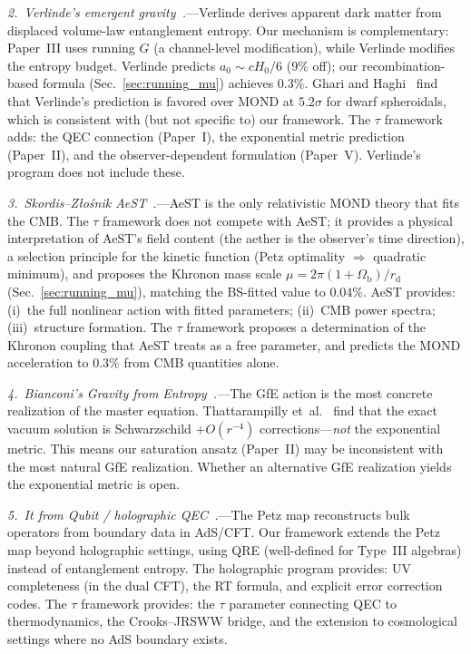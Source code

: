 \documentclass[prd,twocolumn,superscriptaddress,longbibliography,floatfix]{revtex4-2}
\newcommand{\tauasym}{\tau}
\begin{document}
\emph{2.\ Verlinde's emergent
gravity~\cite{Verlinde2016}.}---Verlinde derives
apparent dark matter from displaced volume-law
entanglement entropy.  Our mechanism is complementary:
Paper~III uses running $G$ (a channel-level modification),
while Verlinde modifies the entropy budget.
Verlinde predicts $a_0 \sim cH_0/6$ ($9\%$ off);
our recombination-based formula
(Sec.~\ref{sec:running_mu}) achieves $0.3\%$.  Ghari and Haghi~\cite{GhariHaghi2026}
find that Verlinde's prediction is favored over
MOND at $5.2\sigma$ for dwarf spheroidals, which
is consistent with (but not specific to) our framework.
The $\tauasym$ framework adds: the QEC connection
(Paper~I), the exponential metric prediction
(Paper~II), and the observer-dependent formulation
(Paper~V).  Verlinde's program does not include these.

\emph{3.\ Skordis--Z\l{}o\'{s}nik
AeST~\cite{SkordisZlosnik2021}.}---AeST is the only
relativistic MOND theory that fits the CMB.  The
$\tauasym$ framework does not compete with AeST; it
provides a physical interpretation of AeST's field
content (the aether is the observer's time direction),
a selection principle for the kinetic function
(Petz optimality $\Rightarrow$ quadratic minimum),
and proposes the Khronon mass scale
$\mu = 2\pi(1+\Omega_{\mathrm{b}})/r_{\mathrm{d}}$
(Sec.~\ref{sec:running_mu}), matching the BS-fitted
value to $0.04\%$.
AeST provides: (i)~the full nonlinear action with
fitted parameters; (ii)~CMB power spectra;
(iii)~structure formation.  The $\tauasym$ framework
proposes a determination of the Khronon coupling that
AeST treats as a free parameter, and predicts the
MOND acceleration to $0.3\%$ from CMB quantities alone.

\emph{4.\ Bianconi's Gravity from
Entropy~\cite{Bianconi2025,BianconiCosmo2025}.}---The
GfE action is the most concrete realization of the
master equation.  Thattarampilly
et~al.~\cite{Thattarampilly2026} find that the
exact vacuum solution is Schwarzschild $+ O(r^{-4})$
corrections---\emph{not} the exponential metric.
This means our saturation ansatz (Paper~II) may be
inconsistent with the most natural GfE realization.
Whether an alternative GfE realization yields the
exponential metric is open.

\emph{5.\ It from Qubit / holographic
QEC~\cite{Cotler2019}.}---The Petz map reconstructs
bulk operators from boundary data in AdS/CFT.  Our
framework extends the Petz map beyond holographic
settings, using QRE (well-defined for Type~III
algebras) instead of entanglement entropy.  The
holographic program provides: UV completeness (in
the dual CFT), the RT formula, and explicit error
correction codes.  The $\tauasym$ framework provides:
the $\tauasym$ parameter connecting QEC to
thermodynamics, the Crooks--JRSWW bridge, and the
extension to cosmological settings where no AdS
boundary exists.
\end{document}
